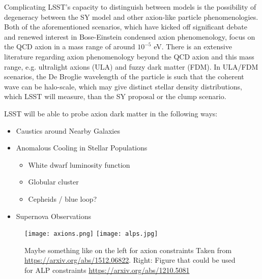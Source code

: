 Complicating LSST's capacity to distinguish between models is the possibility of degeneracy between the SY model and other axion-like particle phenomenologies. Both of the aforementioned scenarios, which have kicked off significant debate and renewed interest in Bose-Einstein condensed axion phenomenology, focus on the QCD axion in a mass range of around $10^{-5}$ eV. There is an extensive literature regarding axion phenomenology beyond the QCD axion and this mass range, e.g. ultralight axions (ULA) and fuzzy dark matter (FDM). In ULA/FDM scenarios, the De Broglie wavelength of the particle is such that the coherent wave can be halo-scale, which may give distinct stellar density distributions, which LSST will measure, than the SY proposal or the clump scenario.

LSST will be able to probe axion dark matter in the following ways:
\begin{itemize}
    \item Caustics around Nearby Galaxies 
    \item Anomalous Cooling in Stellar Populations 
    \begin{itemize}
        \item White dwarf luminosity function
        \item Globular cluster
        \item Cepheids / blue loop?
    \end{itemize}
    \item Supernova Observations
    
\end{itemize}

\begin{figure}
\centering
\texttt{[image: axions.png]}
\texttt{[image: alps.jpg]}
\caption{Maybe something like on the left for axion constraints 
Taken from \citep{Redino:2015} \url{https://arxiv.org/abs/1512.06822}. Right: Figure that could be used for ALP constraints \citep{Ringwald:2012} \url{https://arxiv.org/abs/1210.5081}}
\end{figure}


